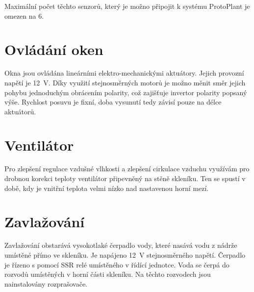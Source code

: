 Maximální počet těchto senzorů, který je možno připojit k systému ProtoPlant je omezen na 6.

\section{Ovládání oken}
Okna jsou ovládána lineárními elektro-mechanickými aktuátory.
Jejich provozní napětí je 12~V.
Díky využití stejnosměrných motorů je možno měnit směr jejich pohybu jednoduchým obrácením polarity, což zajišťuje invertor polarity popsaný výše.
Rychlost posuvu je fixní, doba vysunutí tedy závisí pouze na délce aktuátorů.

\section{Ventilátor}
Pro zlepšení regulace vzdušné vlhkosti a zlepšení cirkulace vzduchu využívám pro drobnou korekci teploty ventilátor připevněný na stěně skleníku.
Ten se spustí v době, kdy je vnitřní teplota velmi nízko nad nastavenou horní mezí.

\section{Zavlažování}
Zavlažování obstarává vysokotlaké čerpadlo vody, které nasává vodu z nádrže umístěné přímo ve skleníku.
Je napájeno 12~V stejnosměrného napětí.
Čerpadlo je řízeno s pomocí SSR relé umístěného v řídící jednotce.
Voda se čerpá do rozvodů umístěných v horní části skleníku.
Na těchto rozvodech jsou nainstalovány rozprašovače.



